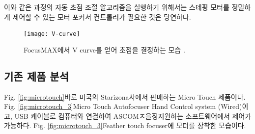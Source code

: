 이와 같은 과정의 자동 초점 조절 알고리즘을 실행하기 위해서는 스테핑 모터를 정밀하게 제어할 수 있는 모터 포커서 컨트롤러가 필요한 것은 당연하다. 

\begin{figure}[h]
	\begin{center}
		\texttt{[image: V-curve]}
	\end{center}
	\caption{FocusMAX에서 V curve를 얻어 초점을 결정하는 모습 \cite{weber2001fast}.}
	\label{fig:V-curve}
\end{figure}

\clearpage

\subsection{기존 제품 분석}

Fig. \ref{fig:microtouch}\가 바로 미국의 Starizona사에서 판매하는 Micro Touch  제품이다. Fig. \ref{fig:microtouch_3}\가 Micro Touch Autofocuser Hand Control system (Wired)이고, USB 케이블로 컴퓨터와 연결하여 ASCOMㅈ을징지원하는 소프트웨어에서 제어가 가능하다.  Fig. \ref{fig:microtouch_3}\는 Feather touch focuser에 모터를 장착한 모습이다. 



